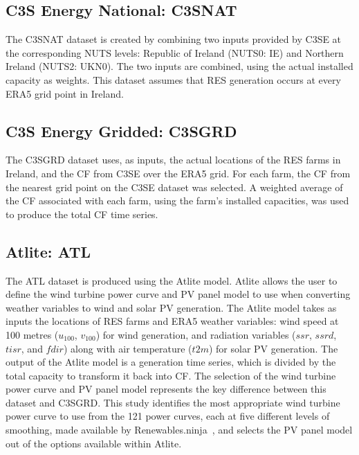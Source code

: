 \documentclass[preprint, 12pt]{elsarticle}
\providecommand{\DIFadd}[1]{{\protect\color{blue}\uwave{#1}}} %
\providecommand{\DIFaddbegin}{} %
\providecommand{\DIFaddend}{} %
\begin{document}
\subsection{C3S Energy National: C3S\DIFaddbegin \DIFadd{~}\DIFaddend NAT}
\label{sec:c3se_n}

The C3S\DIFaddbegin \DIFadd{~}\DIFaddend NAT dataset is created by combining two inputs provided by C3SE at the corresponding NUTS levels: Republic of Ireland (NUTS0: IE) and Northern Ireland (NUTS2: UKN0). The two inputs are combined, using the actual installed capacity as weights. This dataset assumes that RES generation occurs at every ERA5 grid point in Ireland. 

\subsection{C3S Energy Gridded: C3S\DIFaddbegin \DIFadd{~}\DIFaddend GRD}
\label{sec:c3se_g}

The C3S\DIFaddbegin \DIFadd{~}\DIFaddend GRD dataset uses, as inputs, the actual locations of the RES farms in Ireland, and the CF from C3SE over the ERA5 grid. For each farm, the CF from the nearest grid point on the C3SE dataset was selected. A weighted average of the CF associated with each farm, using the farm's installed capacities, was used to produce the total CF time series.

\subsection{Atlite: ATL} 
\label{sec:atlite}

The ATL dataset is produced using the Atlite model. Atlite allows the user to define the wind turbine power curve and PV panel model to use when converting weather variables to wind and solar PV generation. The Atlite model takes as inputs the locations of RES farms and ERA5 weather variables: wind speed at 100 metres ($u_{100}$, $v_{100}$) for wind generation, and radiation variables ($ssr$, $ssrd$, $tisr$, and $fdir$) along with air temperature ($t2m$) for solar PV generation. The output of the Atlite model is a generation time series, which is divided by the total capacity to transform it back into CF. The selection of the wind turbine power curve and PV panel model represents the key difference between this dataset and C3S\DIFaddbegin \DIFadd{~}\DIFaddend GRD. This study identifies the most appropriate wind turbine power curve to use from the 121 power curves, each at five different levels of smoothing, made available by Renewables.ninja~\citep{staffell2016wake}, and selects the PV panel model out of the options available within Atlite.
\end{document}
